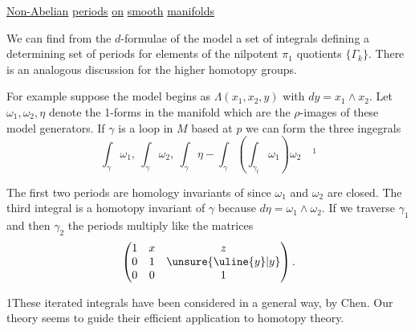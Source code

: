 \uline{Non-Abelian} \uline{periods} \uline{on} \uline{smooth} \uline{manifolds}

We can find from the $d$-formulae of the model a set
of integrals defining a determining set of periods for
elements of the nilpotent $\pi_1$ quotients $\{\Gamma_k\}$. There is an
analogous discussion for the higher homotopy groups.

For example suppose the model begins as $\Lambda(x_1,x_2,y)$
with $dy=x_1\wedge x_2$. Let $\omega_1,\omega_2,\eta$ denote the 1-forms in
the manifold which are the $\rho$-images of these model generators.
If $\gamma$ is a loop in $M$ based at $p$ we can form the three
ingegrals
\[
\int_\gamma\omega_1,\ \int_\gamma\omega_2,\
\int_\gamma\eta-\int_\gamma\left(\int_{\gamma_t}\omega_1\right)\omega_2
\quad{}^1
\]

The first two periods are homology invariants of
since $\omega_1$ and $\omega_2$ are closed. The third integral is a
homotopy invariant of $\gamma$ because $d\eta=\omega_1\wedge\omega_2$. If we
traverse $\gamma_1$ and then $\gamma_2$ the periods multiply like the
matrices
\[
\begin{pmatrix}1&x&z\\0&1&\unsure{\uline{y}|y}\\0&0&1\end{pmatrix}.
\]


1\quad These iterated integrals have been considered in
a general way, by Chen. Our theory seems to guide
their efficient application to homotopy theory.

